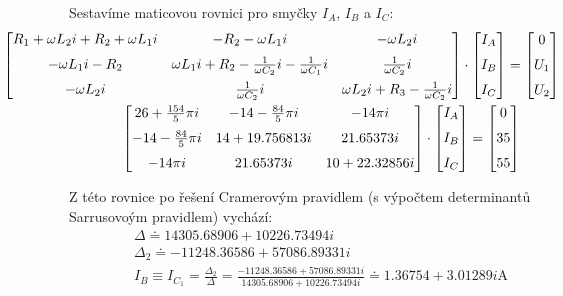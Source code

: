 \documentclass[12pt,a4paper]{article}
\begin{document}
	Sestavíme maticovou rovnici pro smyčky $I_A$, $I_B$ a $I_C$:
	\begin{gather*}
		\hspace{-2cm}
		\begin{bmatrix}
			R_1 + \omega  L_2 i + R_2 + \omega L_1 i  &  -R_2 - \omega L_1 i  &  -\omega L_2 i \\[6pt]
			-\omega L_1 i - R_2  &  \omega L_1 i + R_2 - \frac{1}{\omega C_2} i - \frac{1}{\omega C_1} i  &  \frac{1}{\omega C_2} i \\[6pt]
			-\omega L_2 i  &  \frac{1}{\omega C_2} i  &  \omega L_2 i + R_3 - \frac{1}{\omega C_2} i
		\end{bmatrix}
		\cdot
		\begin{bmatrix}
			I_A \\[6pt]
			I_B \\[6pt]
			I_C
		\end{bmatrix}
		=
		\begin{bmatrix}
			0 \\[6pt]
			U_1 \\[6pt]
			U_2
		\end{bmatrix}
		\\
		\begin{bmatrix}
			26 + \frac{154}{5} \pi i  &  -14 - \frac{84}{5} \pi i  &  -14 \pi i \\[6pt]
			-14 - \frac{84}{5} \pi i  &  14 + 19.756813 i          &  21.65373 i \\[6pt]
			-14 \pi i                 &  21.65373 i                &  10 + 22.32856 i
		\end{bmatrix}
		\cdot
		\begin{bmatrix}
			I_A \\[6pt]
			I_B \\[6pt]
			I_C
		\end{bmatrix}
		=
		\begin{bmatrix}
			0 \\[6pt]
			35 \\[6pt]
			55
		\end{bmatrix}
	\end{gather*}

	Z této rovnice po řešení Cramerovým pravidlem (s výpočtem determinantů Sarrusovoým pravidlem) vychází:
	\begin{gather*}
		\Delta \doteq 14305.68906 + 10226.73494i \\
		\Delta_2 \doteq -11248.36586 + 57086.89331i \\
		I_B \equiv I_{C_1} = \frac{\Delta_2}{\Delta} = \frac{-11248.36586 + 57086.89331i}{14305.68906 + 10226.73494i}
		\doteq 1.36754 + 3.01289i \text{A}
	\end{gather*}
\end{document}
